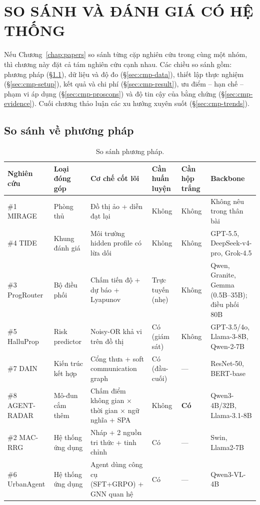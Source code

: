 \chapter{SO SÁNH VÀ ĐÁNH GIÁ CÓ HỆ THỐNG}
\label{chap:comparison}

Nếu Chương~\ref{chap:papers} so sánh từng cặp nghiên cứu trong cùng một nhóm, thì chương này đặt cả tám nghiên cứu cạnh nhau. Các chiều so sánh gồm: phương pháp (\S\ref{sec:cmp-method}), dữ liệu và độ đo (\S\ref{sec:cmp-data}), thiết lập thực nghiệm (\S\ref{sec:cmp-setup}), kết quả và chi phí (\S\ref{sec:cmp-result}), ưu điểm -- hạn chế -- phạm vi áp dụng (\S\ref{sec:cmp-proscons}) và độ tin cậy của bằng chứng (\S\ref{sec:cmp-evidence}). Cuối chương thảo luận các xu hướng xuyên suốt (\S\ref{sec:cmp-trends}).

\section{So sánh về phương pháp}
\label{sec:cmp-method}

\begin{table}[!htbp]
\centering
\footnotesize
\caption{So sánh phương pháp.}
\label{tab:cmp-method}
\begin{tabularx}{\textwidth}{L{1.9cm} L{2.0cm} L{2.4cm} C{1.5cm} C{1.4cm} Y}
\toprule
\textbf{Nghiên cứu} & \textbf{Loại đóng góp} & \textbf{Cơ chế cốt lõi} & \textbf{Cần huấn luyện} & \textbf{Cần hộp trắng} & \textbf{Backbone} \\
\midrule
\#1 MIRAGE & Phòng thủ & Đồ thị ảo + diễn đạt lại & Không & Không & Không nêu trong thân bài \\
\#4 TIDE & Khung đánh giá & Môi trường hidden profile có lừa dối & Không & Không & GPT-5.5, DeepSeek-v4-pro, Grok-4.5 \\
\#3 ProgRouter & Bộ điều phối & Chấm tiến độ + dự báo + Lyapunov & Trực tuyến (nhẹ) & Không & Qwen, Granite, Gemma (0.5B--35B); điều phối 80B \\
\#5 HalluProp & Risk predictor & Noisy-OR khả vi trên đồ thị & Có (giám sát) & Không & GPT-3.5/4o, Llama-3-8B, Qwen-2-7B \\
\#7 DAIN & Kiến trúc kết hợp & Cổng thưa + soft communication graph & Có (đầu-cuối) & --- & ResNet-50, BERT-base \\
\#8 AGENT-RADAR & Mô-đun cắm thêm & Chấm điểm không gian $\times$ thời gian $\times$ ngữ nghĩa + SPA & Không & \textbf{Có} & Qwen3-4B/32B, Llama-3.1-8B \\
\#2 MAC-RRG & Hệ thống ứng dụng & Nháp + 2 nguồn tri thức + tinh chỉnh & Có & --- & Swin, Llama2-7B \\
\#6 UrbanAgent & Hệ thống ứng dụng & Agent dùng công cụ (SFT+GRPO) + GNN quan hệ & Có & --- & Qwen3-VL-4B \\
\bottomrule
\end{tabularx}
\end{table}

